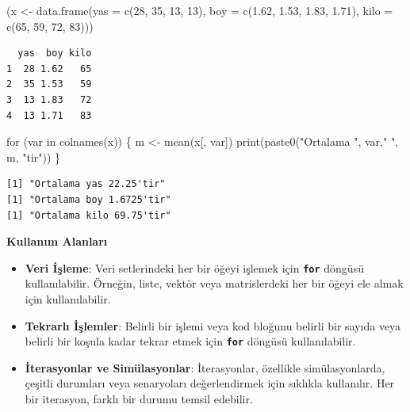 \documentclass[
  letterpaper,
  DIV=11,
  numbers=noendperiod]{scrreprt}
\newenvironment{Shaded}{\begin{snugshade}}{\end{snugshade}}
\newcommand{\AttributeTok}[1]{\textcolor[rgb]{0.40,0.45,0.13}{#1}}
\newcommand{\ControlFlowTok}[1]{\textcolor[rgb]{0.00,0.23,0.31}{#1}}
\newcommand{\DecValTok}[1]{\textcolor[rgb]{0.68,0.00,0.00}{#1}}
\newcommand{\FloatTok}[1]{\textcolor[rgb]{0.68,0.00,0.00}{#1}}
\newcommand{\FunctionTok}[1]{\textcolor[rgb]{0.28,0.35,0.67}{#1}}
\newcommand{\NormalTok}[1]{\textcolor[rgb]{0.00,0.23,0.31}{#1}}
\newcommand{\OtherTok}[1]{\textcolor[rgb]{0.00,0.23,0.31}{#1}}
\newcommand{\StringTok}[1]{\textcolor[rgb]{0.13,0.47,0.30}{#1}}
\begin{document}
\begin{Shaded}
\begin{Highlighting}[]
\NormalTok{(x }\OtherTok{\textless{}{-}} \FunctionTok{data.frame}\NormalTok{(}\AttributeTok{yas =} \FunctionTok{c}\NormalTok{(}\DecValTok{28}\NormalTok{, }\DecValTok{35}\NormalTok{, }\DecValTok{13}\NormalTok{, }\DecValTok{13}\NormalTok{),}
                \AttributeTok{boy =} \FunctionTok{c}\NormalTok{(}\FloatTok{1.62}\NormalTok{, }\FloatTok{1.53}\NormalTok{, }\FloatTok{1.83}\NormalTok{, }\FloatTok{1.71}\NormalTok{),}
                \AttributeTok{kilo =} \FunctionTok{c}\NormalTok{(}\DecValTok{65}\NormalTok{, }\DecValTok{59}\NormalTok{, }\DecValTok{72}\NormalTok{, }\DecValTok{83}\NormalTok{)))}
\end{Highlighting}
\end{Shaded}

\begin{verbatim}
  yas  boy kilo
1  28 1.62   65
2  35 1.53   59
3  13 1.83   72
4  13 1.71   83
\end{verbatim}

\begin{Shaded}
\begin{Highlighting}[]
\ControlFlowTok{for}\NormalTok{ (var }\ControlFlowTok{in} \FunctionTok{colnames}\NormalTok{(x)) \{}
\NormalTok{    m }\OtherTok{\textless{}{-}} \FunctionTok{mean}\NormalTok{(x[, var])}
    \FunctionTok{print}\NormalTok{(}\FunctionTok{paste0}\NormalTok{(}\StringTok{"Ortalama "}\NormalTok{, var,}\StringTok{" "}\NormalTok{, m, }\StringTok{"\textquotesingle{}tir"}\NormalTok{))}
\NormalTok{\}}
\end{Highlighting}
\end{Shaded}

\begin{verbatim}
[1] "Ortalama yas 22.25'tir"
[1] "Ortalama boy 1.6725'tir"
[1] "Ortalama kilo 69.75'tir"
\end{verbatim}

\textbf{Kullanım Alanları}

\begin{itemize}
\item
  \textbf{Veri İşleme}: Veri setlerindeki her bir öğeyi işlemek için
  \textbf{\texttt{for}} döngüsü kullanılabilir. Örneğin, liste, vektör
  veya matrislerdeki her bir öğeyi ele almak için kullanılabilir.
\item
  \textbf{Tekrarlı İşlemler}: Belirli bir işlemi veya kod bloğunu
  belirli bir sayıda veya belirli bir koşula kadar tekrar etmek için
  \textbf{\texttt{for}} döngüsü kullanılabilir.
\item
  \textbf{İterasyonlar ve Simülasyonlar}: İterasyonlar, özellikle
  simülasyonlarda, çeşitli durumları veya senaryoları değerlendirmek
  için sıklıkla kullanılır. Her bir iterasyon, farklı bir durumu temsil
  edebilir.
\end{itemize}
\end{document}
